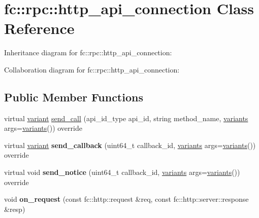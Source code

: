 \hypertarget{classfc_1_1rpc_1_1http__api__connection}{}\section{fc\+:\+:rpc\+:\+:http\+\_\+api\+\_\+connection Class Reference}
\label{classfc_1_1rpc_1_1http__api__connection}


Inheritance diagram for fc\+:\+:rpc\+:\+:http\+\_\+api\+\_\+connection\+:


Collaboration diagram for fc\+:\+:rpc\+:\+:http\+\_\+api\+\_\+connection\+:
\subsection*{Public Member Functions}
\begin{DoxyCompactItemize}
\item 
virtual \mbox{\hyperlink{classfc_1_1variant}{variant}} \mbox{\hyperlink{classfc_1_1rpc_1_1http__api__connection_a3f613b413f6792e3aa631d8e20f4f2c9}{send\+\_\+call}} (api\+\_\+id\+\_\+type api\+\_\+id, string method\+\_\+name, \mbox{\hyperlink{classstd_1_1vector}{variants}} args=\mbox{\hyperlink{classstd_1_1vector}{variants}}()) override
\item 
\mbox{\label{classfc_1_1rpc_1_1http__api__connection_a14fc66782552d9a76279a5c2f6fc3f14}} 
virtual \mbox{\hyperlink{classfc_1_1variant}{variant}} {\bfseries send\+\_\+callback} (uint64\+\_\+t callback\+\_\+id, \mbox{\hyperlink{classstd_1_1vector}{variants}} args=\mbox{\hyperlink{classstd_1_1vector}{variants}}()) override
\item 
\mbox{\label{classfc_1_1rpc_1_1http__api__connection_a95fd35a8597ba6beefd424ccafff04f0}} 
virtual void {\bfseries send\+\_\+notice} (uint64\+\_\+t callback\+\_\+id, \mbox{\hyperlink{classstd_1_1vector}{variants}} args=\mbox{\hyperlink{classstd_1_1vector}{variants}}()) override
\item 
\mbox{\label{classfc_1_1rpc_1_1http__api__connection_a188a41e7a1bdda4cd09b6fb9fbd7e30b}} 
void {\bfseries on\+\_\+request} (const fc\+::http\+::request \&req, const fc\+::http\+::server\+::response \&resp)
\end{DoxyCompactItemize}
